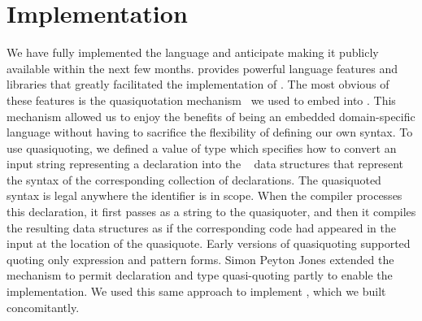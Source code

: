 \section{Implementation}
\label{sec:implementation}



We have fully implemented the \forest{} language and anticipate making
it publicly available within the next few months.
\haskell{} provides powerful language features and libraries that
greatly facilitated the implementation of \forest{}.  The most obvious
of these features is the quasiquotation mechanism~\cite{Mainland:quasi}
we used to embed \forest{} into \haskell{}.  This mechanism
allowed us to enjoy the benefits of being an embedded domain-specific
language without having to sacrifice the flexibility of
defining our own syntax. To use quasiquoting, we defined a \haskell{}
value  of type  which specifies how to
convert an input string representing a \forest{} declaration into the
\template{}~\cite{Sheard+:templatehaskell} 
data structures that represent the syntax of the
corresponding collection of \haskell{} declarations.
The quasiquoted syntax 
is legal anywhere the identifier  is in scope.
When the \haskell{} compiler processes this declaration, it first
passes  as a string to the  quasiquoter, and
then it compiles the resulting \template{} data structures as if the
corresponding \haskell{} code had appeared in the input at the
location of the quasiquote.  Early versions of quasiquoting
supported quoting only expression and pattern forms.  Simon Peyton
Jones extended the mechanism to permit declaration and type
quasi-quoting partly to enable the \forest{} implementation.  We used
this same approach to implement \padshaskell{}, which we built
concomitantly. 

